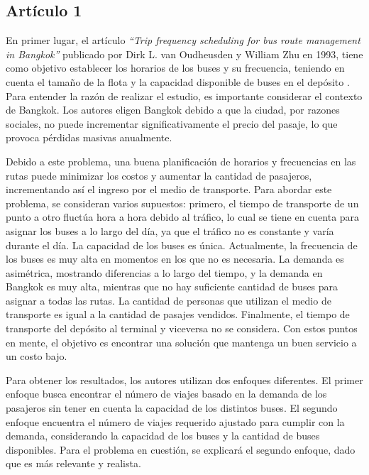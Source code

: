 \documentclass[preprint,11pt]{elsarticle}
\begin{document}
\subsection*{Artículo 1}

En primer lugar, el artículo \textit{“Trip frequency scheduling for bus route management in Bangkok”} publicado por Dirk L. van Oudheusden y William Zhu en 1993, tiene como objetivo establecer los horarios de los buses y su frecuencia, teniendo en cuenta el tamaño de la flota y la capacidad disponible de buses en el depósito \cite{vanoudheusden1995}. Para entender la razón de realizar el estudio, es importante considerar el contexto de Bangkok. Los autores eligen Bangkok debido a que la ciudad, por razones sociales, no puede incrementar significativamente el precio del pasaje, lo que provoca pérdidas masivas anualmente.

Debido a este problema, una buena planificación de horarios y frecuencias en las rutas puede minimizar los costos y aumentar la cantidad de pasajeros, incrementando así el ingreso por el medio de transporte. Para abordar este problema, se consideran varios supuestos: primero, el tiempo de transporte de un punto a otro fluctúa hora a hora debido al tráfico, lo cual se tiene en cuenta para asignar los buses a lo largo del día, ya que el tráfico no es constante y varía durante el día. La capacidad de los buses es única. Actualmente, la frecuencia de los buses es muy alta en momentos en los que no es necesaria. La demanda es asimétrica, mostrando diferencias a lo largo del tiempo, y la demanda en Bangkok es muy alta, mientras que no hay suficiente cantidad de buses para asignar a todas las rutas. La cantidad de personas que utilizan el medio de transporte es igual a la cantidad de pasajes vendidos. Finalmente, el tiempo de transporte del depósito al terminal y viceversa no se considera. Con estos puntos en mente, el objetivo es encontrar una solución que mantenga un buen servicio a un costo bajo.

Para obtener los resultados, los autores utilizan dos enfoques diferentes. El primer enfoque busca encontrar el número de viajes basado en la demanda de los pasajeros sin tener en cuenta la capacidad de los distintos buses. El segundo enfoque encuentra el número de viajes requerido ajustado para cumplir con la demanda, considerando la capacidad de los buses y la cantidad de buses disponibles. Para el problema en cuestión, se explicará el segundo enfoque, dado que es más relevante y realista.
\end{document}
